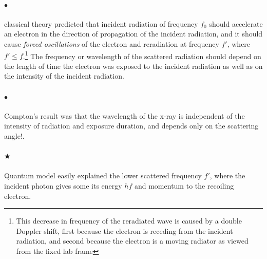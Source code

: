     \paragraph{$\bullet$} classical theory predicted that incident radiation of frequency $f_0$ should accelerate an electron 
    in the direction of propagation of the incident radiation, and it should cause \textit{forced oscillations} of the electron 
    and reradiation at frequency $f'$, where $f' \le f$.\footnote{This decrease in frequency of the reradiated wave is caused 
    by a double Doppler shift, first because the electron is receding from the incident radiation, and second because the electron
    is a moving radiator as viewed from the fixed lab frame} The frequency or wavelength of the scattered radiation should depend 
    on the length of time the electron was exposed to the incident radiation as well as on the intensity of the incident radiation.

    \paragraph{$\bullet$} Compton's result was that the wavelength of the x-ray is independent of the intensity of radiation and
    exposure duration, and depends only on the scattering angle!.

    \paragraph{\color{c3}$\bigstar$} Quantum model easily explained the lower scattered frequency $f'$, where the incident photon gives 
    some its energy $hf$ and momentum to the recoiling electron.

